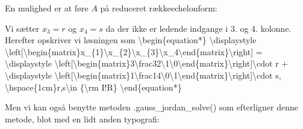 \documentclass[letterpaper,10pt,english]{jupyterBook}
\begin{document}
En mulighed er at føre \(A\) på reduceret række\sphinxhyphen{}echelonform:

\begin{sphinxVerbatim}[commandchars=\\\{\}]
  \PYG{p}{[}\PYG{p}{[}   \PYG{p}{]} \PYG{p}{[}   \PYG{p}{]} \PYG{p}{[}   \PYG{p}{]}\PYG{p}{]}
\end{sphinxVerbatim}

\noindent{}

Vi sætter \(x_3 = r\) og \(x_4 = s\) da der ikke er ledende indgange i 3. og 4. kolonne. Herefter opskriver vi løsningen som
\textbackslash{}begin\{equation*\}
\textbackslash{}displaystyle \textbackslash{}left{[}\textbackslash{}begin\{matrix\}x\_\{1\}\textbackslash{}x\_\{2\}\textbackslash{}x\_\{3\}\textbackslash{}x\_4\textbackslash{}end\{matrix\}\textbackslash{}right{]} =
\textbackslash{}displaystyle \textbackslash{}left{[}\textbackslash{}begin\{matrix\}\sphinxhyphen{}3\sphinxhyphen{}\textbackslash{}frac32\textbackslash{}1\textbackslash{}0\textbackslash{}end\{matrix\}\textbackslash{}right{]}\textbackslash{}cdot r +
\textbackslash{}displaystyle \textbackslash{}left{[}\textbackslash{}begin\{matrix\}\sphinxhyphen{}1\sphinxhyphen{}\textbackslash{}frac14\textbackslash{}0\textbackslash{}1\textbackslash{}end\{matrix\}\textbackslash{}right{]}\textbackslash{}cdot s, \textbackslash{}hspace\{1cm\}r,s\textbackslash{}in \{\textbackslash{}rm I!R\}
\textbackslash{}end\{equation*\}

Men vi kan også benytte metoden .gauss\_jordan\_solve() som efterligner denne metode, blot med en lidt anden typografi:

\begin{sphinxVerbatim}[commandchars=\\\{\}]
  \PYG{p}{[}  \PYG{p}{]}
\end{sphinxVerbatim}
\end{document}
